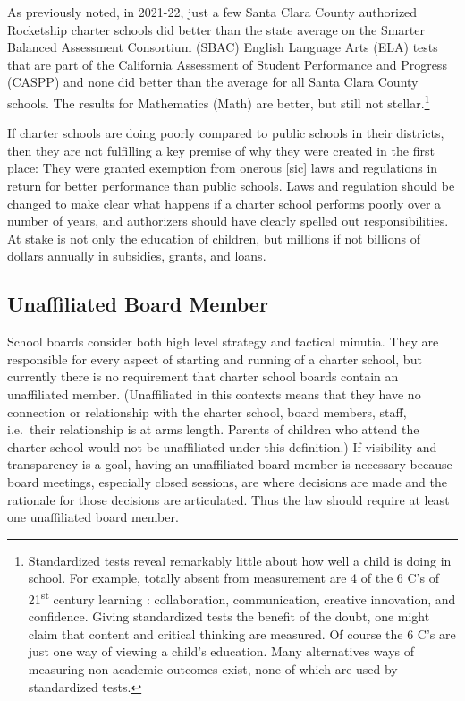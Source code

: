 As previously noted, in 2021-22, just a few Santa Clara County authorized Rocketship charter schools did better than the state average on the Smarter Balanced Assessment Consortium (SBAC) English Language Arts (ELA) tests that are part of the California Assessment of Student Performance and Progress (CASPP) and none did better than the average for all Santa Clara County schools. The results for Mathematics (Math) are better, but still not stellar.\footnote{Standardized tests reveal remarkably little about how well a child is doing in school. For example, totally absent from measurement are 4 of the 6 C's of 21\textsuperscript{st}  century learning \parencite{Hirsh-Pasek.etal2020}: collaboration, communication, creative innovation, and confidence. Giving standardized tests the benefit of the doubt, one might claim that content and critical thinking are measured. Of course the 6 C's are just one way of viewing a child's education. Many alternatives ways of measuring non-academic outcomes exist, none of which are used by standardized tests.}

If charter schools are doing poorly compared to public schools in their districts, then they are not fulfilling a key premise of why they were created in the first place: They were granted exemption from onerous [sic] laws and regulations in return for better performance than public schools. Laws and regulation should be changed to make clear what happens if a charter school performs poorly over a number of years, and authorizers should have clearly spelled out responsibilities. At stake is not only the education of children, but millions if not billions of dollars annually in subsidies, grants, and loans.

\subsection{Unaffiliated Board Member}%
\label{sec:unaff-board-memb}%

School boards consider both high level strategy and tactical minutia. They are responsible for every aspect of starting and running of a charter school, but currently there is no requirement that charter school boards contain an unaffiliated member. (Unaffiliated in this contexts means that they have no connection or relationship with the charter school, board members, staff, i.e.\ their relationship is at arms length. Parents of children who attend the charter school would not be unaffiliated under this definition.) If visibility and transparency is a goal, having an unaffiliated board member is necessary because board meetings, especially closed sessions, are where decisions are made and the rationale for those decisions are articulated. Thus the law should require at least one unaffiliated board member.

